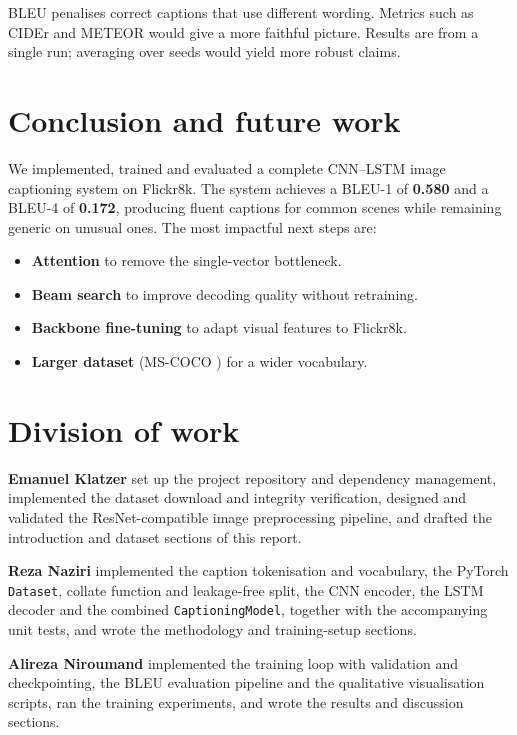 \documentclass{article}
\begin{document}
BLEU penalises correct captions that use different wording. Metrics such as
CIDEr \citep{vedantam2015cider} and METEOR would give a more faithful picture.
Results are from a single run; averaging over seeds would yield more robust
claims.


\section{Conclusion and future work}

We implemented, trained and evaluated a complete CNN--LSTM image captioning
system on Flickr8k. The system achieves a BLEU-1 of \textbf{0.580} and a
BLEU-4 of \textbf{0.172}, producing fluent captions for common scenes while
remaining generic on unusual ones. The most impactful next steps are:
\begin{itemize}
  \item \textbf{Attention} \citep{xu2015show} to remove the single-vector bottleneck.
  \item \textbf{Beam search} to improve decoding quality without retraining.
  \item \textbf{Backbone fine-tuning} to adapt visual features to Flickr8k.
  \item \textbf{Larger dataset} (MS-COCO \citep{lin2014microsoft}) for a wider vocabulary.
\end{itemize}

\section{Division of work}

\textbf{Emanuel Klatzer} set up the project repository and dependency
management, implemented the dataset download and integrity verification, designed
and validated the ResNet-compatible image preprocessing pipeline, and drafted the
introduction and dataset sections of this report.

\textbf{Reza Naziri} implemented the caption tokenisation and vocabulary, the
PyTorch \texttt{Dataset}, collate function and leakage-free split, the CNN
encoder, the LSTM decoder and the combined \texttt{CaptioningModel}, together
with the accompanying unit tests, and wrote the methodology and training-setup
sections.

\textbf{Alireza Niroumand} implemented the training loop with validation and
checkpointing, the BLEU evaluation pipeline and the qualitative visualisation
scripts, ran the training experiments, and wrote the results and discussion
sections.
\end{document}
